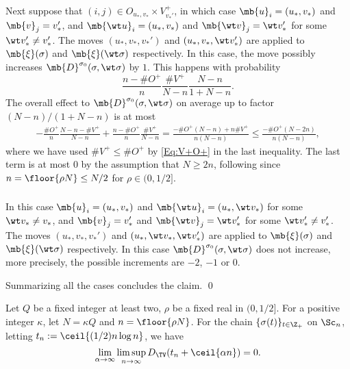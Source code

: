 \documentclass[12pt, reqno]{amsart}
\begin{document}
Next suppose that $(i, j) \in O_{u_\ast, v_\ast}\times V_{v_\ast'}^+$,
in which case $\mb{u}_i=(u_\ast, v_\ast)$ and $\mb{v}_j=v_\ast'$, and $\mb{\wt u}_i=(u_\ast, v_\ast)$ and $\mb{\wt v}_j=\wt v_\ast'$ for some $\wt v_\ast'\neq v_\ast'$.
The moves $(u_\ast, v_\ast, v_\ast')$ and $(u_\ast, v_\ast, \wt v_\ast')$ are applied to $\mb{\xi}(\sigma)$ and $\mb{\xi}(\wt \sigma)$ respectively.
In this case, the move possibly increases $\mb{D}^{\sigma_0}(\sigma, \wt \sigma)$ by $1$.
This happens with probability
\[
\frac{n-\#O^+}{n}\frac{\#V^+}{N-n}\frac{N-n}{1+N-n}.
\]
The overall effect to $\mb{D}^{\sigma_0}(\sigma, \wt \sigma)$ on average up to factor $(N-n)/(1+N-n)$ is at most
\begin{align*}
-\frac{\#O^+}{n}\frac{N-n-\#V^+}{N-n}+\frac{n-\#O^+}{n}\frac{\#V^+}{N-n}
=\frac{-\#O^+(N-n)+n\#V^+}{n(N-n)}\le 
\frac{-\#O^+(N-2n)}{n(N-n)},
\end{align*}
where we have used $\#V^+\le \#O^+$ by \eqref{Eq:V+O+} in the last inequality.
The last term is at most $0$ by the assumption that $N \ge 2n$, following since $n=\floor{\rho N}\le N/2$ for $\rho \in (0, 1/2]$.
\subsubsection*{}
In this case $\mb{u}_i=(u_\ast, v_\ast)$ and $\mb{\wt u}_i=(u_\ast, \wt v_\ast)$ for some $\wt v_\ast \neq v_\ast$,
and $\mb{v}_j=v_\ast'$ and $\mb{\wt v}_j=\wt v_\ast'$ for some $\wt v_\ast'\neq v_\ast'$.
The moves $(u_\ast, v_\ast, v_\ast')$ and $(u_\ast, \wt v_\ast, \wt v_\ast')$ are applied to $\mb{\xi}(\sigma)$ and $\mb{\xi}(\wt \sigma)$ respectively.
In this case $\mb{D}^{\sigma_0}(\sigma, \wt \sigma)$ does not increase,
more precisely, the possible increments are $-2$, $-1$ or $0$.

Summarizing all the cases concludes the claim.
\qed



\begin{theorem}\label{Thm:upper}
Let $Q$ be a fixed integer at least two, $\rho$ be a fixed real in $(0,1/2]$.
For a positive integer $\kappa$,
let $N=\kappa Q$ and $n=\floor{\rho N}$.
For the chain $\{\sigma(t)\}_{t\in \Z_+}$ on $\Sc_n$,
letting $t_n:=\ceil{(1/2)n\log n}$,
we have
\[
\lim_{\alpha \to \infty}\limsup_{n\to \infty}D_\TV(t_n +\ceil{\alpha n})=0.
\]
\end{theorem}
\end{document}
